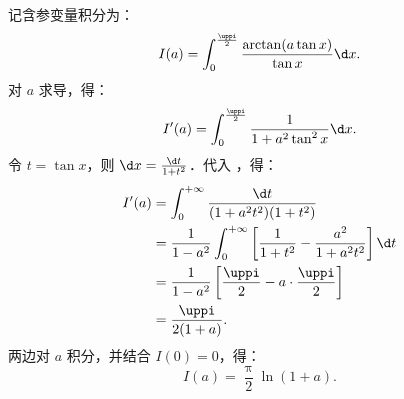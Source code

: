 \begin{solution}
    记含参变量积分为：
    \begin{equation}
        I(a) = \int_0^{\frac{\uppi}{2}} \frac{\arctan(a \tan x)}{\tan x} \d x.
    \end{equation}
    对 $a$ 求导，得：
    \begin{equation}\label{eq:int3-deriv}
        I'(a) = \int_0^{\frac{\uppi}{2}} \frac{1}{1 + a^2 \tan^2 x} \d x.
    \end{equation}
    令 $t = \tan x$，则 $\d x = \frac{\d t}{1 + t^2}$．代入 ，得：
    \begin{equation}
        \begin{aligned}
            I'(a) & = \int_0^{+\infty} \frac{\d t}{(1 + a^2 t^2)(1 + t^2)}                                               \\
                  & = \frac{1}{1 - a^2} \int_0^{+\infty} \left[ \frac{1}{1 + t^2} - \frac{a^2}{1 + a^2 t^2} \right] \d t \\
                  & = \frac{1}{1 - a^2} \left[ \frac{\uppi}{2} - a \cdot \frac{\uppi}{2} \right]                         \\
                  & = \frac{\uppi}{2(1 + a)}.
        \end{aligned}
    \end{equation}
    两边对 $a$ 积分，并结合 $I(0) = 0$，得：
    \begin{equation}
        \boxed{I(a) = \frac{\uppi}{2} \ln(1 + a)}.
    \end{equation}



\end{solution}
